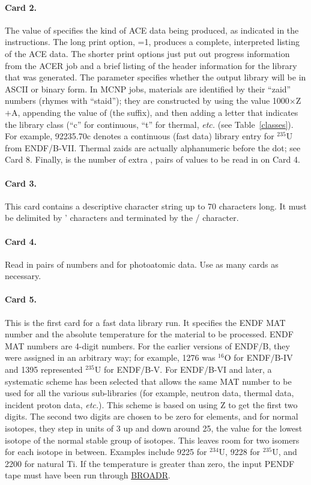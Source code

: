 \paragraph{Card 2.}
The value of  specifies the kind of ACE data being produced,
as indicated in the instructions.  The long print option, =1,
produces a complete, interpreted listing of the ACE data.  The shorter
print options just put out progress information from the ACER job and
a brief listing of the header information for the library that was
generated.  The  parameter specifies whether the output
library will be in ASCII or binary form.  In MCNP jobs, materials are
identified by their ``zaid'' numbers (rhymes with ``staid''); they are
constructed by using the value 1000$\times$Z$+$A, appending the value
of  (the suffix), and then adding a letter that indicates
the library class (``c'' for continuous, ``t'' for thermal, {\it etc.}
(see Table~\ref{classes}).  For example, 92235.70c denotes a
continuous (fast data) library entry for $^{235}$U from ENDF/B-VII.
Thermal zaids are actually alphanumeric before the dot; see Card 8.
Finally,  is the number of extra , 
pairs of values to be read in on Card 4.

\paragraph{Card 3.}
This card contains a descriptive character string up to 70 characters
long.  It must be delimited by ' characters and terminated by the /
character.

\paragraph{Card 4.}
Read in  pairs of numbers  and  for
photoatomic data.  Use as many cards as necessary.

\paragraph{Card 5.}
This is the first card for a fast data library run.  It specifies the
ENDF MAT number and the absolute temperature for the material to be
processed.   ENDF MAT numbers are 4-digit numbers.  For the earlier
versions of ENDF/B, they were assigned in an arbitrary way; for example,
1276 was $^{16}$O for ENDF/B-IV and 1395 represented $^{235}$U for ENDF/B-V.
For ENDF/B-VI and later, a systematic scheme has been selected that allows the
same MAT number to be used for all the various sub-libraries (for example,
neutron data, thermal data, incident proton data, {\it etc.}).  This
scheme is based on using Z to get the first two digits.  The second two
digits are chosen to be zero for elements, and for normal isotopes, they
step in units of 3 up and down around 25, the value for the lowest
isotope of the normal stable group of isotopes.  This leaves room for
two isomers for each isotope in between.  Examples include 9225 for
$^{234}$U, 9228 for $^{235}$U, and 2200 for natural Ti. If the
temperature is greater than zero, the input PENDF tape must have
been run through \hyperlink{sBROADRhy}{BROADR}.

